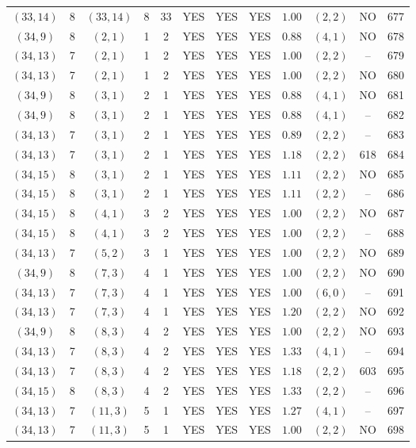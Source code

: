 \begin{longtable}{|c|c|c|c|c|c|c|c|c|c|c|c|}
$(33,14)$ & 8 & $(33,14)$ & 8 & 33 & YES & YES & YES & $1.00$ & $(2,2)$ & NO & 677\\
$(34,9)$ & 8 & $(2,1)$ & 1 & 2 & YES & YES & YES & $0.88$ & $(4,1)$ & NO & 678\\
$(34,13)$ & 7 & $(2,1)$ & 1 & 2 & YES & YES & YES & $1.00$ & $(2,2)$ & -- & 679\\
$(34,13)$ & 7 & $(2,1)$ & 1 & 2 & YES & YES & YES & $1.00$ & $(2,2)$ & NO & 680\\
$(34,9)$ & 8 & $(3,1)$ & 2 & 1 & YES & YES & YES & $0.88$ & $(4,1)$ & NO & 681\\
$(34,9)$ & 8 & $(3,1)$ & 2 & 1 & YES & YES & YES & $0.88$ & $(4,1)$ & -- & 682\\
$(34,13)$ & 7 & $(3,1)$ & 2 & 1 & YES & YES & YES & $0.89$ & $(2,2)$ & -- & 683\\
$(34,13)$ & 7 & $(3,1)$ & 2 & 1 & YES & YES & YES & $1.18$ & $(2,2)$ & 618 & 684\\
$(34,15)$ & 8 & $(3,1)$ & 2 & 1 & YES & YES & YES & $1.11$ & $(2,2)$ & NO & 685\\
$(34,15)$ & 8 & $(3,1)$ & 2 & 1 & YES & YES & YES & $1.11$ & $(2,2)$ & -- & 686\\
$(34,15)$ & 8 & $(4,1)$ & 3 & 2 & YES & YES & YES & $1.00$ & $(2,2)$ & NO & 687\\
$(34,15)$ & 8 & $(4,1)$ & 3 & 2 & YES & YES & YES & $1.00$ & $(2,2)$ & -- & 688\\
$(34,13)$ & 7 & $(5,2)$ & 3 & 1 & YES & YES & YES & $1.00$ & $(2,2)$ & NO & 689\\
$(34,9)$ & 8 & $(7,3)$ & 4 & 1 & YES & YES & YES & $1.00$ & $(2,2)$ & NO & 690\\
$(34,13)$ & 7 & $(7,3)$ & 4 & 1 & YES & YES & YES & $1.00$ & $(6,0)$ & -- & 691\\
$(34,13)$ & 7 & $(7,3)$ & 4 & 1 & YES & YES & YES & $1.20$ & $(2,2)$ & NO & 692\\
$(34,9)$ & 8 & $(8,3)$ & 4 & 2 & YES & YES & YES & $1.00$ & $(2,2)$ & NO & 693\\
$(34,13)$ & 7 & $(8,3)$ & 4 & 2 & YES & YES & YES & $1.33$ & $(4,1)$ & -- & 694\\
$(34,13)$ & 7 & $(8,3)$ & 4 & 2 & YES & YES & YES & $1.18$ & $(2,2)$ & 603 & 695\\
$(34,15)$ & 8 & $(8,3)$ & 4 & 2 & YES & YES & YES & $1.33$ & $(2,2)$ & -- & 696\\
$(34,13)$ & 7 & $(11,3)$ & 5 & 1 & YES & YES & YES & $1.27$ & $(4,1)$ & -- & 697\\
$(34,13)$ & 7 & $(11,3)$ & 5 & 1 & YES & YES & YES & $1.00$ & $(2,2)$ & NO & 698\\

\end{longtable}
